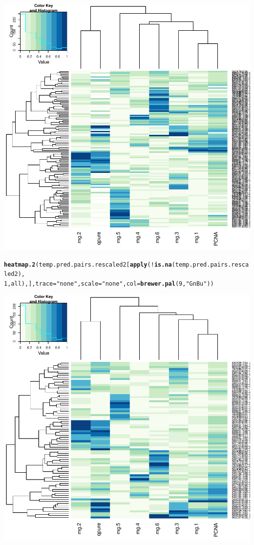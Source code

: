 \documentclass{article}\usepackage[]{graphicx}\usepackage[]{color}
\makeatletter
\def\maxwidth{ %
  \ifdim\Gin@nat@width>\linewidth
    \linewidth
  \else
    \Gin@nat@width
  \fi
}
\newcommand{\hlnum}[1]{\textcolor[rgb]{0.686,0.059,0.569}{#1}}%
\newcommand{\hlstr}[1]{\textcolor[rgb]{0.192,0.494,0.8}{#1}}%
\newcommand{\hlopt}[1]{\textcolor[rgb]{0,0,0}{#1}}%
\newcommand{\hlstd}[1]{\textcolor[rgb]{0.345,0.345,0.345}{#1}}%
\newcommand{\hlkwc}[1]{\textcolor[rgb]{0.333,0.667,0.333}{#1}}%
\newcommand{\hlkwd}[1]{\textcolor[rgb]{0.737,0.353,0.396}{\textbf{#1}}}%
\newenvironment{kframe}{%
 \def\at@end@of@kframe{}%
 \ifinner\ifhmode%
  \def\at@end@of@kframe{\end{minipage}}%
  \begin{minipage}{\columnwidth}%
 \fi\fi%
 \def\FrameCommand##1{\hskip\@totalleftmargin \hskip-\fboxsep
 \colorbox{shadecolor}{##1}\hskip-\fboxsep
     \hskip-\linewidth \hskip-\@totalleftmargin \hskip\columnwidth}%
 \MakeFramed {\advance\hsize-\width
   \@totalleftmargin\z@ \linewidth\hsize
   \@setminipage}}%
 {\par\unskip\endMakeFramed%
 \at@end@of@kframe}
\newenvironment{knitrout}{}{} %
\makeatother
\begin{document}
\begin{knitrout}
{\centering \includegraphics[width=\maxwidth]{figure/metagene-pairs-4} 

}


\begin{kframe}\begin{alltt}
\hlkwd{heatmap.2}\hlstd{(temp.pred.pairs.rescaled2[}\hlkwd{apply}\hlstd{(}\hlopt{!}\hlkwd{is.na}\hlstd{(temp.pred.pairs.rescaled2),}
    \hlnum{1}\hlstd{, all), ],} \hlkwc{trace} \hlstd{=} \hlstr{"none"}\hlstd{,} \hlkwc{scale} \hlstd{=} \hlstr{"none"}\hlstd{,} \hlkwc{col} \hlstd{=} \hlkwd{brewer.pal}\hlstd{(}\hlnum{9}\hlstd{,} \hlstr{"GnBu"}\hlstd{))}
\end{alltt}
\end{kframe}

{\centering \includegraphics[width=\maxwidth]{figure/metagene-pairs-5} 

}
\end{knitrout}
\end{document}
